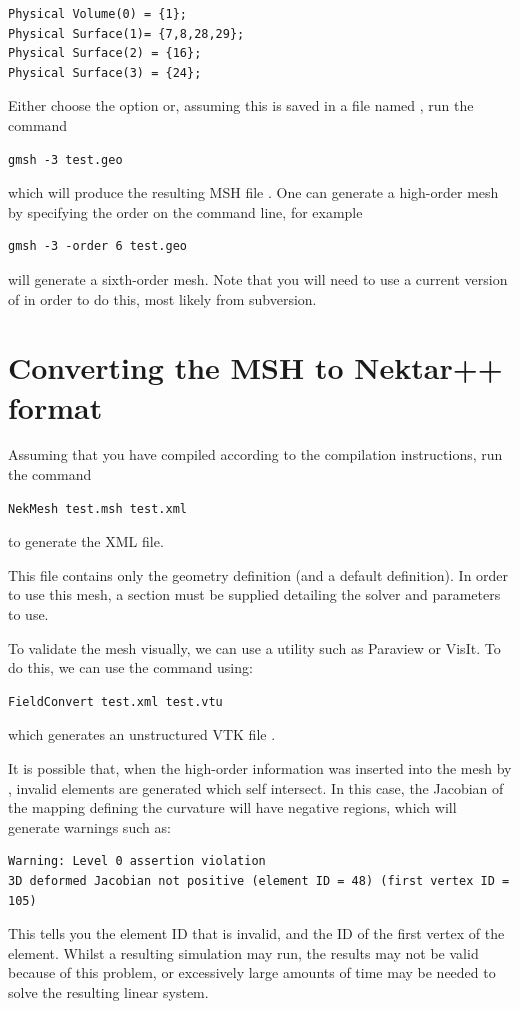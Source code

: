 \begin{lstlisting}[style=XmlStyle]
Physical Volume(0) = {1};
Physical Surface(1)= {7,8,28,29};
Physical Surface(2) = {16};
Physical Surface(3) = {24};
\end{lstlisting}
Either choose the option  or, assuming this is saved in
a file named , run the command
\begin{lstlisting}[style=BashInputStyle]
gmsh -3 test.geo
\end{lstlisting}
which will produce the resulting MSH file . One can generate a
high-order mesh by specifying the order on the command line, for example
\begin{lstlisting}[style=BashInputStyle]
gmsh -3 -order 6 test.geo
\end{lstlisting}
will generate a sixth-order mesh. Note that you will need to use a current
version of \gmsh in order to do this, most likely from subversion.

\section{Converting the MSH to Nektar++ format}
Assuming that you have compiled \nekpp according to the compilation
instructions, run the command
%
\begin{lstlisting}[style=BashInputStyle]
NekMesh test.msh test.xml
\end{lstlisting}
%
to generate the XML file.
%
\begin{notebox}
  This file contains only the geometry definition (and a default
   definition). In order to use this mesh, a
   section must be supplied detailing the solver and
  parameters to use.
\end{notebox}
%
To validate the mesh visually, we can use a utility such as Paraview or
VisIt. To do this, we can use the  command using:
%
\begin{lstlisting}[style=BashInputStyle]
FieldConvert test.xml test.vtu
\end{lstlisting}
%
which generates an unstructured VTK file .

It is possible that, when the high-order information was inserted into the mesh
by \gmsh, invalid elements are generated which self intersect. In this case, the
Jacobian of the mapping defining the curvature will have negative regions, which
will generate warnings such as:
\begin{lstlisting}[style=BashInputStyle]
Warning: Level 0 assertion violation
3D deformed Jacobian not positive (element ID = 48) (first vertex ID = 105)
\end{lstlisting}
This tells you the element ID that is invalid, and the ID of the first vertex of
the element. Whilst a resulting simulation may run, the results may not be valid
because of this problem, or excessively large amounts of time may be needed to
solve the resulting linear system.



